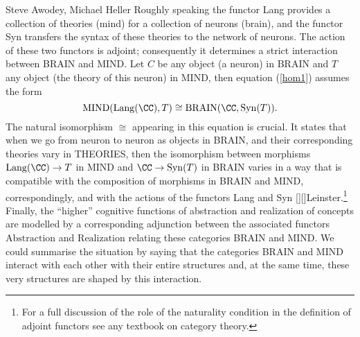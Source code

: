 \begin{artengenv2auth}{Steve Awodey, Michael Heller}
Roughly speaking the functor Lang provides a collection of theories (mind) for a collection of neurons (brain), and the functor Syn transfers the syntax of these theories to the network of neurons. The action of these two functors is adjoint; consequently it determines a strict interaction between BRAIN and MIND. Let $C$ be any object (a neuron) in BRAIN and $T$ any object (the theory of this neuron) in MIND, then equation (\ref{hom1}) assumes the form
\begin{equation}
\label{hom2}
\mathrm{MIND}(\mathrm{Lang}(\CC ), T) \cong {\mathrm{BRAIN}}(\CC , \mathrm{Syn}(T)).
 \end{equation}
The natural isomorphism $\cong $ appearing in this equation is crucial. It states that when we go from neuron to neuron as objects in BRAIN, and their corresponding theories vary in THEORIES, then the isomorphism between morphisms $\mathrm{Lang}(\CC ) \to T$ in MIND and $\CC \to \mathrm{Syn}(T)$ in BRAIN varies in a way that is compatible with the composition of morphisms in BRAIN and MIND, correspondingly, and with the actions of the functors Lang and Syn \parencite[see[]{AF}[][]{Leinster}.\footnote{For a full discussion of the role of the naturality condition in the definition of adjoint functors see any textbook on category theory.} 
%
Finally, the ``higher'' cognitive functions of abstraction and realization of concepts are modelled by a corresponding adjunction between the associated functors $\mathrm{Abstraction}$ and $\mathrm{Realization}$ relating these categories BRAIN and MIND. 
%
We could summarise the situation by saying that the categories BRAIN and MIND interact with each other with their entire structures and, at the same time, these very structures are shaped by this interaction.


\end{artengenv2auth}

